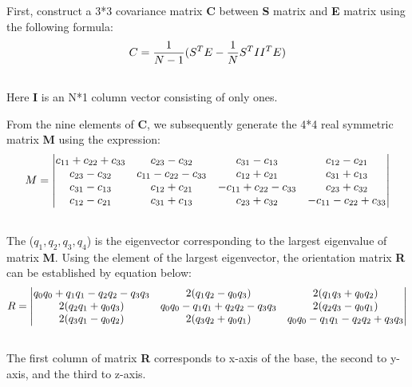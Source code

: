 \documentclass[letterpaper,10pt,english]{sphinxmanual}
\begin{document}
First, construct a 3*3 covariance matrix \textbf{C} between \textbf{S} matrix and \textbf{E} matrix using the following formula:
\begin{gather}
\begin{split}C=\frac{1}{N-1}(S^T  E - \frac{1}{N} S^T  I  I^T  E)\end{split}\notag\\\begin{split}\end{split}\notag
\end{gather}
Here \textbf{I} is an N*1 column vector consisting of only ones.

From the nine elements of \textbf{C}, we subsequently generate the 4*4 real symmetric matrix \textbf{M} using the expression:
\begin{gather}
\begin{split}M=
\begin{vmatrix}
c_{11}+c_{22}+c_{33} & c_{23}-c_{32}         &  c_{31}-c_{13}        & c_{12}-c_{21} \\
c_{23}-c_{32}        & c_{11}-c_{22}-c_{33}  &  c_{12}+c_{21}        & c_{31}+c_{13} \\
c_{31}-c_{13}        & c_{12}+c_{21}         & -c_{11}+c_{22}-c_{33} & c_{23}+c_{32} \\
c_{12}-c_{21}        & c_{31}+c_{13}         &  c_{23}+c_{32}        & -c_{11}-c_{22}+c_{33} \\
\end{vmatrix}\end{split}\notag\\\begin{split}\end{split}\notag
\end{gather}
The ($q_1,q_2,q_3,q_4$) is the eigenvector corresponding to the largest eigenvalue of matrix \textbf{M}. Using the element of the largest eigenvector, the orientation matrix \textbf{R} can be established by equation below:
\begin{gather}
\begin{split}R=
\begin{vmatrix}
q_0q_0+q_1q_1-q_2q_2-q_3q_3  &  2(q_1q_2 - q_0q_3)           & 2(q_1q_3+q_0q_2) \\
2(q_2q_1+q_0q_3)             &  q_0q_0-q_1q_1+q_2q_2-q_3q_3  & 2(q_2q_3-q_0q_1) \\
2(q_3q_1-q_0q_2)             &  2(q_3q_2 + q_0q_1)           & q_0q_0-q_1q_1- q_2q_2+q_3q_3 \\
\end{vmatrix}\end{split}\notag\\\begin{split}\end{split}\notag
\end{gather}
The first column of matrix \textbf{R} corresponds to x-axis of the base, the second to y-axis, and the third to z-axis.
\end{document}
